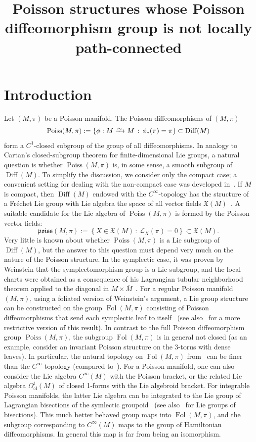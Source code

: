 \documentclass[AHL,Unicode,published]{cedram}
\title{Poisson structures whose Poisson diffeomorphism group is not locally path-connected}
\author[\initial{I.} \lastname{M\u{a}rcuȚ}]{\firstname{Ioan} \lastname{M\u{a}rcuȚ}}
\newcommand{\diffto}{\xrightarrow{\raisebox{-0.2 em}[0pt][0pt]{\smash{\ensuremath{\sim}}}}}
\newcommand{\fkX}{\mathfrak{X}}
\newcommand{\clL}{\mathcal{L}}
\newcommand{\cl}{\mathrm{cl}}
\newcommand{\fkPoiss}{\mathfrak{poiss}}
\DeclareMathOperator{\Poiss}{Poiss}
\DeclareMathOperator{\Diff}{Diff}
\DeclareMathOperator{\Fol}{Fol}
\begin{document}
\maketitle
\pagebreak
\section*{Introduction}

Let $(M,\pi)$ be a Poisson manifold. The Poisson diffeomorphisms of $(M,\pi)$
\[
\Poiss(M,\pi):=\left\{\phi:M\diffto M\, : \, \phi_*(\pi)=\pi\right\}\subset \Diff(M)
\]
form a $C^1$-closed subgroup of the group of all diffeomorphisms. In analogy to Cartan's closed-subgroup theorem for finite-dimensional Lie groups, a natural question is whether $\Poiss(M,\pi)$ is, in some sense, a smooth subgroup of $\Diff(M)$. To simplify the discussion, we consider only the compact case; a convenient setting for dealing with the non-compact case was developed in~\cite{Michor}. If $M$ is compact, then $\Diff(M)$ endowed with the $C^{\infty}$-topology has the structure of a Fréchet Lie group with Lie algebra the space of all vector fields $\fkX(M)$~\cite{Hamilton,Milnor}. A suitable candidate for the Lie algebra of $\Poiss(M,\pi)$ is formed by the Poisson vector fields:
\[
\fkPoiss(M,\pi):=\left\{ X\in \fkX(M)\, : \, \clL_X(\pi)=0\right\}\subset \fkX(M).
\]
Very little is known about whether $\Poiss(M,\pi)$ is a Lie subgroup of $\Diff(M)$, but the answer to this question must depend very much on the nature of the Poisson structure. In the symplectic case, it was proven by Weinstein that the symplectomorphism group is a Lie subgroup, and the local charts were obtained as a consequence of his Lagrangian tubular neighborhood theorem applied to the diagonal in $M\times \overline{M}$~\cite{Weinstein}. For a regular Poisson manifold $(M,\pi)$, using a foliated version of Weinstein's argument, a Lie group structure can be constructed on the group $\Fol(M,\pi)$ consisting of Poisson diffeomorphisms that send each symplectic leaf to itself~\cite{Rybicki} (see also~\cite{Banyaga} for a more restrictive version of this result). In contrast to the full Poisson diffeomorphism group $\Poiss(M,\pi)$, the subgroup $\Fol(M,\pi)$ is in general not closed (as an example, consider an invariant Poisson structure on the 3-torus with dense leaves). In particular, the natural topology on $\Fol(M,\pi)$ from~\cite{Rybicki} can be finer than the $C^{\infty}$-topology (compared to~\cite{Banyaga}). For a Poisson manifold, one can also consider the Lie algebra $C^{\infty}(M)$ with the Poisson bracket, or the related Lie algebra $\Omega^1_{\cl}(M)$ of closed 1-forms with the Lie algebroid bracket. For integrable Poisson manifolds, the latter Lie algebra can be integrated to the Lie group of Lagrangian bisections of the symlectic groupoid~\cite{Xu} (see also~\cite{SW} for Lie groups of bisections). This much better behaved group maps into $\Fol(M,\pi)$, and the subgroup corresponding to $C^{\infty}(M)$ maps to the group of Hamiltonian diffeomorphisms. In general this map is far from being an isomorphism.
\end{document}
